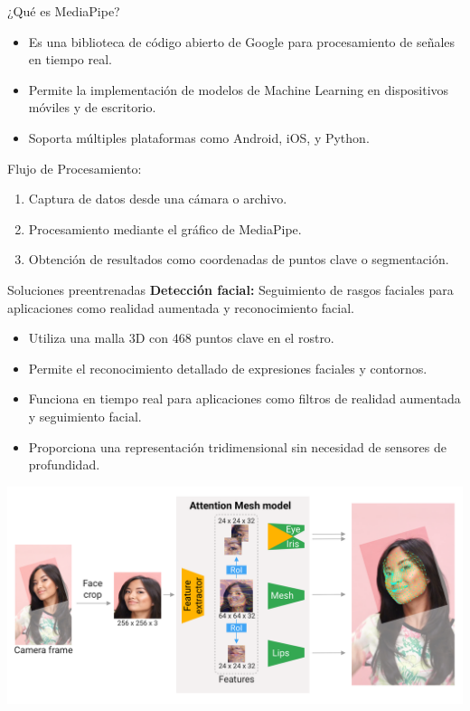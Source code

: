 
\begin{frame}{¿Qué es MediaPipe?}
    \begin{itemize}
        \item Es una biblioteca de código abierto de Google para procesamiento de señales en tiempo real.
        \item Permite la implementación de modelos de Machine Learning en dispositivos móviles y de escritorio.
        \item Soporta múltiples plataformas como Android, iOS, y Python.
    \end{itemize}
    Flujo de Procesamiento:
    \begin{enumerate}
        \item Captura de datos desde una cámara o archivo.
        \item Procesamiento mediante el gráfico de MediaPipe.
        \item Obtención de resultados como coordenadas de puntos clave o segmentación.
    \end{enumerate}

\end{frame}

\begin{frame}{Soluciones preentrenadas}
    \textbf{Detección facial:} Seguimiento de rasgos faciales para aplicaciones como realidad aumentada y reconocimiento facial.
     \begin{itemize}
        \item Utiliza una malla 3D con 468 puntos clave en el rostro.
        \item Permite el reconocimiento detallado de expresiones faciales y contornos.
        \item Funciona en tiempo real para aplicaciones como filtros de realidad aumentada y seguimiento facial.
        \item Proporciona una representación tridimensional sin necesidad de sensores de profundidad.
    \end{itemize}
    \begin{center}
        \includegraphics[width=0.6\linewidth]{01_MediaPipe/fase_mesh_detection.png}
    \end{center}
\end{frame}

